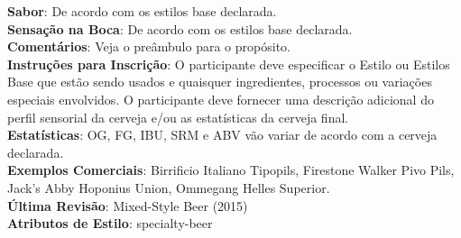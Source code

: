 \textbf{Sabor}: De acordo com os estilos base declarada. \\
\textbf{Sensação na Boca}: De acordo com os estilos base declarada. \\
\textbf{Comentários}: Veja o preâmbulo para o propósito. \\
\textbf{Instruções para Inscrição}: O participante deve especificar o Estilo ou Estilos Base que estão sendo usados e quaisquer ingredientes, processos ou variações especiais envolvidos. O participante deve fornecer uma descrição adicional do perfil sensorial da cerveja e/ou as estatísticas da cerveja final. \\
\textbf{Estatísticas}: OG, FG, IBU, SRM e ABV vão variar de acordo com a cerveja declarada. \\
\textbf{Exemplos Comerciais}: Birrificio Italiano Tipopils, Firestone Walker Pivo Pils, Jack’s Abby Hoponius Union, Ommegang Helles Superior.\\
\textbf{Última Revisão}: Mixed-Style Beer (2015) \\
\textbf{Atributos de Estilo}: specialty-beer
